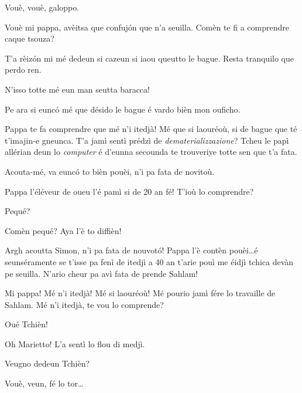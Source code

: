 \begin{drama}
\Sahlammspeaks Vouè, vouè, galoppo\galoppe.


\Simonspeaks Vouè mi pappa, avèitsa que confuj\'on que n’a seuilla. Comèn te fi a comprendre caque tsouza?

\Cienspeaks {} T’a rèiz\'on mi mé dedeun si cazeun si iaou queutto le bague. Resta tranquilo que perdo ren.

\Simonspeaks N’isso totte mé eun man seutta baracca!

\Cienspeaks Pe ara si eunc\'o mé que désido le bague é  vardo bièn mon ouficho.

\Simonspeaks Pappa te fa comprendre que mé n'i itedjà! Mé que si laouréoù, si de bague que té t'imajin-e gneunca. T’a jamì sentì prédzì de \textit{dematerializzazione}? Tcheu le papì allérian deun lo \textit{computer} é d’eunna secounda te trouveriye totte sen que t’a fata.

\Cienspeaks Acouta-mé, va eunc\'o to bièn pouèi, n’i pa fata de novitoù.

\Simonspeaks Pappa l’éléveur de oueu l’é pamì si de 20 an fé! T'ioù lo comprendre?

\Cienspeaks Pequé?

\Simonspeaks Comèn pequé? Aya l'è to diffièn!

\Cienspeaks Argh acoutta Simon, n'i pa fata de nouvot\'o! Pappa l’è con\-tèn pouèi\ldots é seunséramente se t’isse pa fenì de itedjì a 40 an t’arie pouì me éidjì tchica devàn pe seuilla. N’ario cheur pa avì fata de prende Sahlam!

\Simonspeaks Mi pappa! Mé n'i itedjà! Mé si laouréoù! Mé pourio jamì fére lo travaille de Sahlam. Mé n'i itedjà, te vou lo comprende?

\scene[-- Marietto]


\Mariettospeaks Oué Tchièn!

\Cienspeaks Oh Marietto!  L’a sentì lo flou di medjì.

\Mariettospeaks Veugno dedeun Tchièn?

\Cienspeaks Vouè, veun, fé lo tor\ldots



\end{drama}

